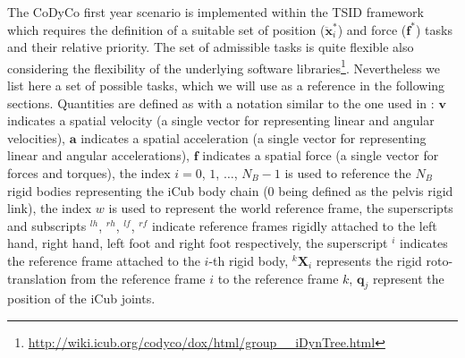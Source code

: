 \documentclass[12pt,a4paper,twoside]{article}
\begin{document}
The CoDyCo first year scenario is implemented within the TSID framework which requires the definition of a suitable set of position ($\ddot {\bm x}_i^*$) and force ($\bm f^*$) tasks and their relative priority. The set of admissible tasks is quite flexible also considering the flexibility of the underlying software libraries\footnote{\url{http://wiki.icub.org/codyco/dox/html/group__iDynTree.html}}. Nevertheless we list here a set of possible tasks, which we will use as a reference in the following sections. Quantities are defined as with a notation similar to the one used in \cite{featherstone2008}: $\bm v$  indicates a spatial velocity (a single vector for representing linear and angular velocities), $\bm a$  indicates a spatial acceleration (a single vector for representing linear and angular accelerations), $\bm f$ indicates a spatial force (a single vector for forces and torques), the index $i  =0$, $1$, $\dots$, $N_B-1$ is used to reference the $N_B$ rigid bodies representing the iCub body chain ($0$ being defined as the pelvis rigid link), the index $w$ is used to represent the world reference frame, the superscripts and subscripts $^{lh}$, $^{rh}$, $^{lf}$, $^{rf}$ indicate reference frames rigidly attached to the left hand, right hand, left foot and right foot respectively, the superscript $^{i}$ indicates the reference frame attached to the $i$-th rigid body, $^k {\bm X}_i$ represents the rigid roto-translation from the reference frame $i$ to the reference frame $k$, $\bm q_j$ represent the position of the iCub joints.
\end{document}
